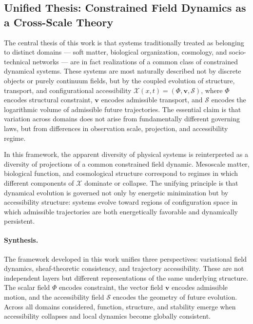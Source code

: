 \documentclass[11pt, a4paper, twocolumn]{article}
\newcommand{\X}{\mathcal{X}}
\newcommand{\Sfield}{\mathcal{S}}
\begin{document}
\subsection{Unified Thesis: Constrained Field Dynamics as a Cross-Scale Theory}

The central thesis of this work is that systems traditionally treated as
belonging to distinct domains --- soft matter, biological organization,
cosmology, and socio-technical networks --- are in fact realizations of a
common class of constrained dynamical systems. These systems are most naturally
described not by discrete objects or purely continuum fields, but by the coupled
evolution of structure, transport, and configurational accessibility
$\X(x,t) = (\Phi,\mathbf{v},\Sfield)$, where $\Phi$ encodes structural
constraint, $\mathbf{v}$ encodes admissible transport, and $\Sfield$ encodes
the logarithmic volume of admissible future trajectories. The essential claim
is that variation across domains does not arise from fundamentally different
governing laws, but from differences in observation scale, projection, and
accessibility regime.

In this framework, the apparent diversity of physical systems is reinterpreted
as a diversity of projections of a common constrained field dynamic. Mesoscale
matter, biological function, and cosmological structure correspond to regimes
in which different components of $\X$ dominate or collapse. The unifying
principle is that dynamical evolution is governed not only by energetic
minimization but by accessibility structure: systems evolve toward regions of
configuration space in which admissible trajectories are both energetically
favorable and dynamically persistent.

\paragraph{Synthesis.}
The framework developed in this work unifies three perspectives: variational
field dynamics, sheaf-theoretic consistency, and trajectory accessibility.
These are not independent layers but different representations of the same
underlying structure. The scalar field $\Phi$ encodes constraint, the vector
field $\mathbf{v}$ encodes admissible motion, and the accessibility field
$\Sfield$ encodes the geometry of future evolution. Across all domains
considered, function, structure, and stability emerge when accessibility
collapses and local dynamics become globally consistent.

\end{document}
